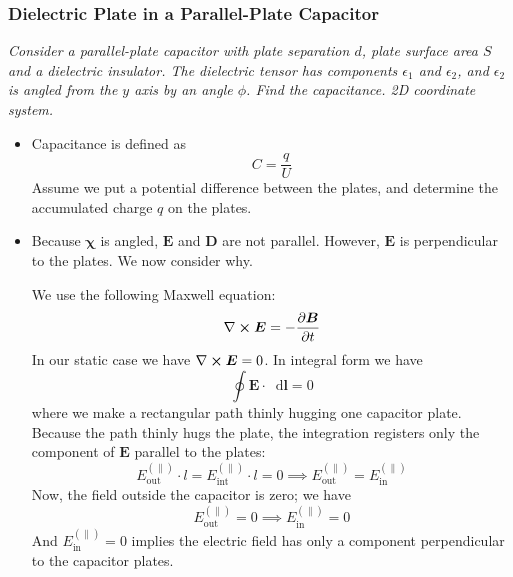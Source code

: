 \documentclass[11pt, a4paper]{article}
\newcommand{\diff}{\mathop{}\!\mathrm{d}} %
\renewcommand{\vec}[1]{\bm{#1}} %
\newcommand{\E}{\vec{E}}  %
\newcommand{\D}{\vec{D}}  %
\newcommand{\B}{\vec{B}}  %
\newcommand{\e}{\epsilon}
\newcommand{\eee}{\bm{\chi}}  %
\renewcommand{\curl}{\nabla \cross}
\begin{document}
\subsubsection{Dielectric Plate in a Parallel-Plate Capacitor}
\textit{Consider a parallel-plate capacitor with plate separation $ d $, plate surface area $ S $ and a dielectric insulator. The dielectric tensor has components $ \e_{1} $ and $ \e_{2} $, and $ \e_{2} $ is angled from the $ y $ axis by an angle $ \phi $. Find the capacitance. 2D coordinate system.}

\begin{itemize}
	\item Capacitance is defined as
	\begin{equation*}
		C = \frac{q}{U}
	\end{equation*}
	Assume we put a potential difference between the plates, and determine the accumulated charge $ q $ on the plates. 
	
	\item Because $ \eee $ is angled, $ \E $ and $ \D $ are not parallel. However, $ \E $ is perpendicular to the plates. We now consider why.
	
	We use the following Maxwell equation:
	\begin{equation*}
		\curl \E = - \pdv{\B}{t} 
	\end{equation*}
	In our static case we have $ \curl \E = 0 $. In integral form we have
	\begin{equation*}
		\oint \E \cdot \diff \vec{l} = 0
	\end{equation*}
	where we make a rectangular path thinly hugging one capacitor plate. Because the path thinly hugs the plate, the integration registers only the component of $ \E $ parallel to the plates:
	\begin{equation*}
		E_{\text{out}}^{(\parallel)}\cdot l = E_{\text{int}}^{(\parallel)} \cdot l = 0 \implies E_{\text{out}}^{(\parallel)} = E_{\text{in}}^{(\parallel)}
	\end{equation*}
	Now, the field outside the capacitor is zero; we have
	\begin{equation*}
		E_{\text{out}}^{(\parallel)} = 0 \implies E_{\text{in}}^{(\parallel)} = 0
	\end{equation*}
	And $ E_{\text{in}}^{(\parallel)} = 0 $ implies the electric field has only a component perpendicular to the capacitor plates. 
	

\end{itemize}
\end{document}

